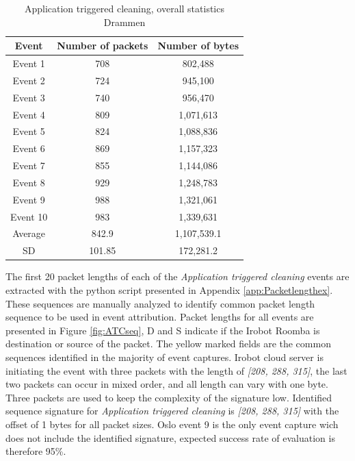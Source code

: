 \begin{table}[H]
\centering
\caption{Application triggered cleaning, overall statistics Drammen}
\label{tab:TCoverallDRA}
\begin{tabular}{|c|c|c|}
\hline
\textbf{Event} & \textbf{Number of packets} & \textbf{Number of bytes} \\ \hline
Event 1        & 708                    & 802,488                    \\ \hline
Event 2        & 724                    & 945,100                    \\ \hline
Event 3        & 740                    & 956,470                    \\ \hline
Event 4        & 809                    & 1,071,613                   \\ \hline
Event 5        & 824                    & 1,088,836                   \\ \hline
Event 6        & 869                    & 1,157,323                   \\ \hline
Event 7        & 855                    & 1,144,086                   \\ \hline
Event 8        & 929                    & 1,248,783                   \\ \hline
Event 9        & 988                    & 1,321,061                   \\ \hline
Event 10       & 983                    & 1,339,631                   \\ \hline
Average        & 842.9                  & 1,107,539.1                 \\ \hline
SD        & 101.85
       & 172,281.2               \\ \hline
\end{tabular}
\end{table}

The first 20 packet lengths of each of the \textit{Application triggered cleaning} events are extracted with the python script presented in Appendix \ref{app:Packetlengthex}. These sequences are manually analyzed to identify common packet length sequence to be used in event attribution. Packet lengths for all events are presented in Figure \ref{fig:ATCseq}, D and S indicate if the Irobot Roomba is destination or source of the packet. The yellow marked fields are the common sequences identified in the majority of event captures. Irobot cloud server is initiating the event with three packets with the length of \textit{[208, 288, 315]}, the last two packets can occur in mixed order, and all length can vary with one byte. Three packets are used to keep the complexity of the signature low. Identified sequence signature for \textit{Application triggered cleaning} is \textit{[208, 288, 315]} with the offset of 1 bytes for all packet sizes. Oslo event 9 is the only event capture wich does not include the identified signature, expected success rate of evaluation is therefore 95\%. 

